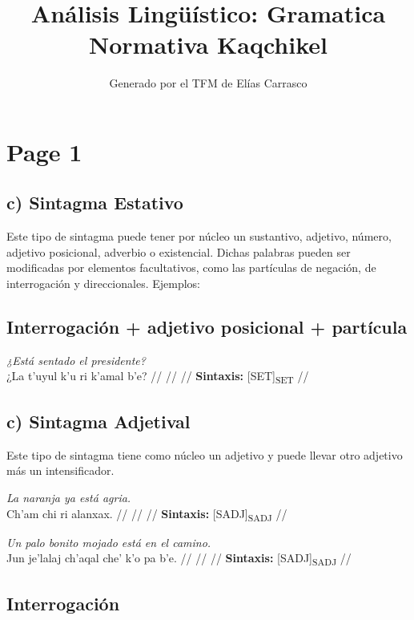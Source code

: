 \documentclass{article}%
\title{Análisis Lingüístico: Gramatica Normativa Kaqchikel}%
\author{Generado por el TFM de Elías Carrasco}%
\begin{document}
%
\normalsize%
\maketitle%
\section{Page 1}%
\label{sec:Page1}%
\subsection{c) Sintagma Estativo}%
\label{subsec:c)SintagmaEstativo}%

%
Este tipo de sintagma puede tener por núcleo un sustantivo, adjetivo, número, adjetivo %
posicional, adverbio o existencial. Dichas palabras pueden ser modificadas por %
elementos facultativos, como las partículas de negación, de interrogación y direccionales. %
Ejemplos: %
\subsection{Interrogación + adjetivo posicional + partícula}%
\label{subsec:Interrogacin+adjetivoposicional+partcula}%

%
\par\medskip%
\ex
\textit{¿Está sentado el presidente?} \\
\begingl
\gla ¿La t’uyul k’u ri k’amal b’e? //
\glb  //
\glc  //
\glft \textbf{Sintaxis:} [SET]\textsubscript{SET} //
\endgl
\xe
%
\medskip%
\subsection{c) Sintagma Adjetival}%
\label{subsec:c)SintagmaAdjetival}%

%
Este tipo de sintagma tiene como núcleo un adjetivo y puede llevar otro adjetivo más un %
intensificador. %
\par\medskip%
\ex
\textit{La naranja ya está agria.} \\
\begingl
\gla Ch'am chi ri alanxax. //
\glb  //
\glc  //
\glft \textbf{Sintaxis:} [SADJ]\textsubscript{SADJ} //
\endgl
\xe
%
\medskip%
\par\medskip%
\ex
\textit{Un palo bonito mojado está en el camino.} \\
\begingl
\gla Jun je’lalaj ch’aqal che' k'o pa b’e. //
\glb  //
\glc  //
\glft \textbf{Sintaxis:} [SADJ]\textsubscript{SADJ} //
\endgl
\xe
%
\medskip%
\subsection{Interrogación}%
\label{subsec:Interrogacin}%
\end{document}
